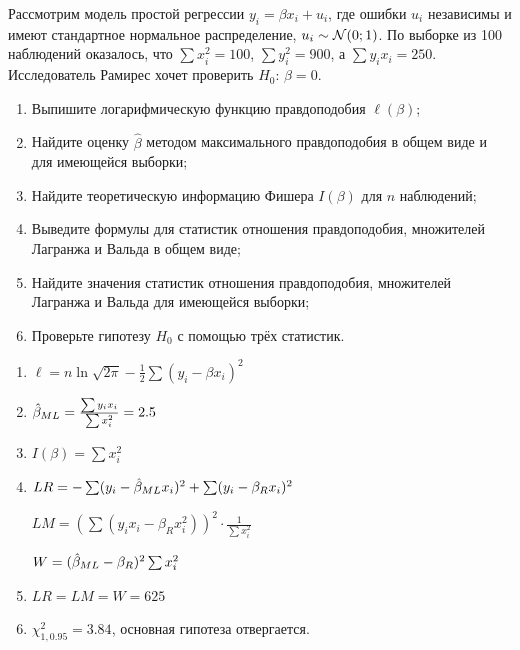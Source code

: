 \begin{problem}
  Рассмотрим модель простой регрессии $y_i = \beta x_i + u_i$,
  где ошибки $u_i$ независимы и имеют стандартное нормальное распределение, $u_i \sim \mathcal{N}(0;1)$.
  По выборке из 100 наблюдений оказалось,
  что $\sum x_i^2 = 100$, $\sum y_i^2=900$,  а $\sum y_i x_i  = 250$.
  Исследователь Рамирес хочет проверить $H_0$: $\beta=0$.


\begin{enumerate}
  \item Выпишите логарифмическую функцию правдоподобия $\ell(\beta)$;
  \item Найдите оценку $\hat \beta$ методом максимального правдоподобия
    в общем виде и для имеющейся выборки;
  \item Найдите теоретическую информацию Фишера $I(\beta)$ для $n$ наблюдений;
  \item Выведите формулы для статистик отношения правдоподобия, множителей Лагранжа и Вальда в общем виде;
  \item Найдите значения статистик отношения правдоподобия, множителей Лагранжа и Вальда для имеющейся выборки;
  \item Проверьте гипотезу $H_0$ с помощью трёх статистик.
\end{enumerate}

\begin{sol}
\begin{enumerate}
\item $\ell = n \ln \sqrt{2\pi} - \frac{1}{2} \sum (y_i - \beta x_i)^2$
\item $\hat{\beta}_{ML} = \frac{\sum y_i x_i}{\sum x_i^2} = 2.5$
\item $I(\beta) = \sum x_i^2$
\item $LR = -\sum (y_i - \hat{\beta}_{ML} x_i)^2 + \sum (y_i - \beta_{R} x_i)^2$

$LM = (\sum (y_i x_i - \beta_R x_i^2))^2 \cdot \frac{1}{\sum x_i^2}$

$W = (\hat{\beta}_{ML} - \beta_R)^2 \sum x_i^2$
\item $LR = LM = W = 625$
\item $\chi^2_{1, 0.95} = 3.84$, основная гипотеза отвергается.
\end{enumerate}
\end{sol}
\end{problem}




